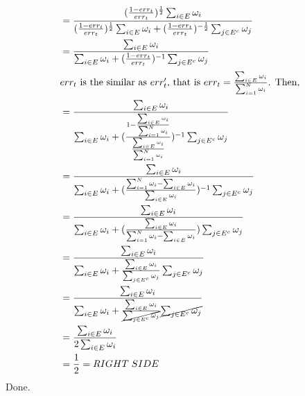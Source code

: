 \documentclass{article}
\begin{document}
\begin{align*}
    &= \frac{(\frac{1-err_t}{err_t})^{\frac{1}{2}}\sum_{i\in E}^{}\omega _i}{(\frac{1-err_t}{err_t})^{\frac{1}{2}}\sum_{i\in E}^{}\omega _i + (\frac{1-err_t}{err_t})^{-\frac{1}{2}}\sum_{j\in E^c}^{}\omega _j}\\
    &= \frac{\sum_{i\in E}^{}\omega _i}{\sum_{i\in E}^{}\omega _i + (\frac{1-err_t}{err_t})^{-1}\sum_{j\in E^c}^{}\omega _j}\\
\intertext{$err_t$ is the similar as $err^\prime_t$, that is $err_t = \frac{\sum_{i\in E}^{}\omega _i}{\sum_{i = 1}^{N}\omega _i}$. Then,}
    &= \frac{\sum_{i\in E}^{}\omega _i}{\sum_{i\in E}^{}\omega _i + (\frac{1-\frac{\sum_{i\in E}^{}\omega _i}{\sum_{i = 1}^{N}\omega _i}}{\frac{\sum_{i\in E}^{}\omega _i}{\sum_{i = 1}^{N}\omega _i}})^{-1}\sum_{j\in E^c}^{}\omega _j}\\
    &= \frac{\sum_{i\in E}^{}\omega _i}{\sum_{i\in E}^{}\omega _i + (\frac{\sum_{i = 1}^{N}\omega _i-\sum_{i\in E}^{}\omega _i}{\sum_{i\in E}^{}\omega _i})^{-1}\sum_{j\in E^c}^{}\omega _j}\\
    &= \frac{\sum_{i\in E}^{}\omega _i}{\sum_{i\in E}^{}\omega _i + (\frac{\sum_{i\in E}^{}\omega _i}{\sum_{i = 1}^{N}\omega _i-\sum_{i\in E}^{}\omega _i})\sum_{j\in E^c}^{}\omega _j}\\
    &= \frac{\sum_{i\in E}^{}\omega _i}{\sum_{i\in E}^{}\omega _i + \frac{\sum_{i\in E}^{}\omega _i}{\sum_{j\in E^c}^{}\omega _j}\sum_{j\in E^c}^{}\omega _j}\\
    &= \frac{\sum_{i\in E}^{}\omega _i}{\sum_{i\in E}^{}\omega _i + \frac{\sum_{i\in E}^{}\omega _i}{\cancel{\sum_{j\in E^c}^{}\omega _j}}\cancel{\sum_{j\in E^c}^{}\omega _j}}\\
    &= \frac{\sum_{i\in E}^{}\omega _i}{2\sum_{i\in E}^{}\omega _i}\\
    &= \frac{1}{2} = RIGHT\; SIDE\\
\end{align*}
Done.
\end{document}
